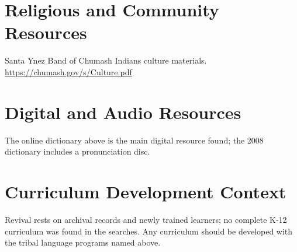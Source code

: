 \documentclass[12pt]{article}
\begin{document}
\section{Religious and Community Resources}
Santa Ynez Band of Chumash Indians culture materials. \url{https://chumash.gov/s/Culture.pdf}

\section{Digital and Audio Resources}
The online dictionary above is the main digital resource found; the 2008 dictionary includes a pronunciation disc.

\section{Curriculum Development Context}
Revival rests on archival records and newly trained learners; no complete K-12 curriculum was found in the searches. Any curriculum should be developed with the tribal language programs named above.
\end{document}
